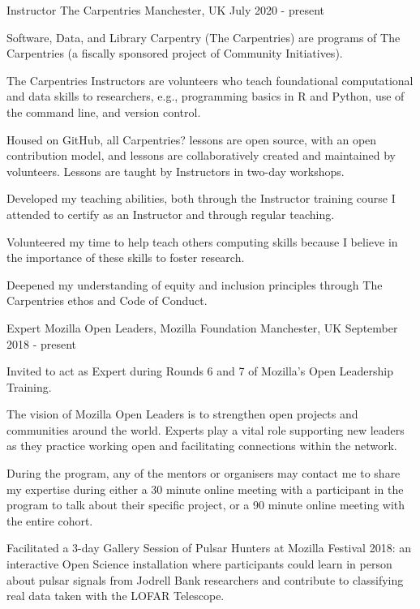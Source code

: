 \begin{cventries}
\cventry
    {Instructor}
    {The Carpentries}
    {Manchester, UK}
    {July 2020 - present}
    {
      \begin{cvitems}
        \item {Software, Data, and Library Carpentry (The Carpentries) are programs of The Carpentries (a fiscally sponsored project of Community Initiatives).}
        \item {The Carpentries Instructors are volunteers who teach foundational computational and data skills to researchers, e.g., programming basics in R and Python, use of the command line, and version control. }
        \item {Housed on GitHub, all Carpentries? lessons are open source, with an open contribution model, and lessons are collaboratively created and maintained by volunteers. Lessons are taught by Instructors in two-day workshops.}
        \item {Developed my teaching abilities, both through the Instructor training course I attended to certify as an Instructor and through regular teaching.}
        \item{Volunteered my time to help teach others computing skills because I believe in the importance of these skills to foster research.}
        \item{Deepened my understanding of equity and inclusion principles through The Carpentries ethos and Code of Conduct.}
      \end{cvitems}
    }
\cventry
    {Expert}
    {Mozilla Open Leaders, Mozilla Foundation}
    {Manchester, UK}
    {September 2018 - present}
    {
      \begin{cvitems}
        \item{Invited to act as Expert during Rounds 6 and 7 of Mozilla's Open Leadership Training.}
        \item{The vision of Mozilla Open Leaders is to strengthen open projects and communities around the world. Experts play a vital role supporting new leaders as they practice working open and facilitating connections within the network.}
        \item{During the program, any of the mentors or organisers may contact me to share my expertise during either a 30 minute online meeting with a participant in the program to talk about their specific project, or a 90 minute online meeting with the entire cohort.}
        \item {Facilitated a 3-day Gallery Session of Pulsar Hunters at Mozilla Festival 2018: an interactive Open Science installation where participants could learn in person about pulsar signals from Jodrell Bank researchers and contribute to classifying real data taken with the LOFAR Telescope.}

\end{cvitems}}
\end{cventries}

